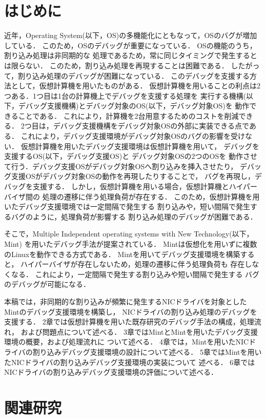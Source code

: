 \documentclass[tanilab-enum]{graduate}
\begin{document}
\chapter{はじめに}\label{chap:introduction}
近年，Operating System(以下，OS)の多機能化にともなって，OSのバグが増加している．
このため，OSのデバッグが重要になっている．
OSの機能のうち，割り込み処理は非同期的な
処理であるため，常に同じタイミングで発生するとは限らない．
このため，割り込み処理を再現することは困難である．
したがって，割り込み処理のデバッグが困難になっている．
このデバッグを支援する方法として，仮想計算機を用いたものがある．
仮想計算機を用いることの利点は2つある．1つ目は1台の計算機上でデバッグを支援する処理を
実行する機構(以下，デバッグ支援機構)とデバッグ対象のOS(以下，デバッグ対象OS)を
動作できることである．
これにより，計算機を2台用意するためのコストを削減できる．
2つ目は，デバッグ支援機構をデバッグ対象OSの外部に実装できる点である．
これにより，デバッグ支援環境がデバッグ対象OSのバグの影響を受けない．
仮想計算機を用いたデバッグ支援環境は仮想計算機を用いて，
デバッグを支援するOS(以下，デバッグ支援OS)と
デバッグ対象OSの2つのOSを
動作させて行う．デバッグ支援OSがデバッグ対象OSへ割り込みを挿入させたり，
デバッグ支援OSがデバッグ対象OSの動作を再現したりすることで，
バグを再現し，デバッグを支援する．
しかし，仮想計算機を用いる場合，仮想計算機とハイパーバイザ間の
処理の遷移に伴う処理負荷が存在する．
このため，仮想計算機を用いたデバッグ支援環境では一定間隔で発生する
割り込みや，短い間隔で発生するバグのように，処理負荷が影響する
割り込み処理のデバッグが困難である．

そこで，Multiple Independent operating systems with New Technology(以下，Mint)\cite{senzaki}
を用いたデバッグ手法が提案されている．
Mintは仮想化を用いずに複数のLinuxを動作できる方式である．
Mintを用いてデバッグ支援環境を構築すると，
ハイパーバイザが存在しないため，処理の遷移に伴う処理負荷も
存在しなくなる．
これにより，一定間隔で発生する割り込みや短い間隔で発生する
バグのデバッグが可能になる．

本稿では，非同期的な割り込みが頻繁に発生するNICドライバを対象とした
Mintのデバッグ支援環境を構築し，
NICドライバの割り込み処理のデバッグを支援する．
2章では仮想計算機を用いた既存研究のデバッグ手法の構成，処理流れ，
および問題点について述べる．
3章ではMintとMintを用いたデバッグ支援環境の概要，および処理流れに
ついて述べる．
4章では，Mintを用いたNICドライバの割り込みデバッグ支援環境の設計について述べる．
5章ではMintを用いたNICドライバの割り込みデバッグ支援環境の実装について
述べる．
6章ではNICドライバの割り込みデバッグ支援環境の評価について述べる．
\chapter{関連研究}\label{chap:kanren}
\end{document}

